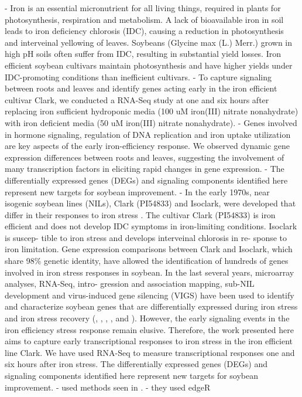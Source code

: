 \documentclass[11pt,a4paper,oldfontcommands,openany]{memoir}
\numberwithin{equation}{section} %
\begin{document}
- Iron is an essential micronutrient for all living things, required in plants for photosynthesis, respiration and metabolism. A lack of bioavailable iron in soil leads to iron deficiency chlorosis (IDC), causing a reduction in photosynthesis and interveinal yellowing of leaves. Soybeans (Glycine max (L.) Merr.) grown in high pH soils often suffer from IDC, resulting in substantial yield losses. Iron efficient soybean cultivars maintain photosynthesis and have higher yields under IDC-promoting conditions than inefficient cultivars.
- To capture signaling between roots and leaves and identify genes acting early in the iron efficient cultivar Clark, we conducted a RNA-Seq study at one and six hours after replacing iron sufficient hydroponic media (100 uM iron(III) nitrate nonahydrate) with iron deficient media (50 uM iron(III) nitrate nonahydrate).
- Genes involved in hormone signaling, regulation of DNA replication and iron uptake utilization are key aspects of the early iron-efficiency response. We observed dynamic gene expression differences between roots and leaves, suggesting the involvement of many transcription factors in eliciting rapid changes in gene expression.
- The differentially expressed genes (DEGs) and signaling components identified here represent new targets for soybean improvement.
- In the early 1970s, near isogenic soybean lines (NILs), Clark (PI54833) and Isoclark, were developed that differ in their responses to iron stress \citealt{soy10}. The cultivar Clark (PI54833) is iron efficient and does not develop IDC symptoms in iron-limiting conditions. Isoclark is suscep- tible to iron stress and develops interveinal chlorosis in re- sponse to iron limitation. Gene expression comparisons between Clark and Isoclark, which share 98\% genetic identity, have allowed the identification of hundreds of genes involved in iron stress responses in soybean. In the last several years, microarray analyses, RNA-Seq, intro- gression and association mapping, sub-NIL development and virus-induced gene silencing (VIGS) have been used to identify and characterize soybean genes that are differentially expressed during iron stress and iron stress recovery (\citealt{soy11}, \citealt{soy12}, \citealt{soy13}, \citealt{soy14}, and \citealt{soy15}). However, the early signaling events in the iron efficiency stress response remain elusive. Therefore, the work presented here aims to capture early transcriptional responses to iron stress in the iron efficient line Clark. We have used RNA-Seq to measure transcriptional responses one and six hours after iron stress. The differentially expressed genes (DEGs) and signaling components identified here represent new targets for soybean improvement.
- used methods seen in \citealt{adSoy}.
- they used edgeR
\end{document}
